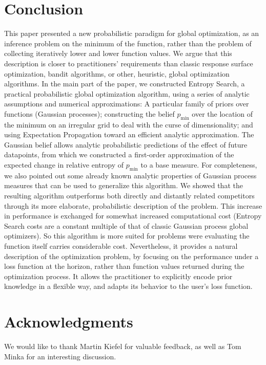 \documentclass[twoside,11pt]{article}
\newcommand{\pmin}{p_{\min}}
\begin{document}
\section{Conclusion}
\label{sec:conclusion}

This paper presented a new probabilistic paradigm for global
optimization, as an inference problem on the minimum of the function,
rather than the problem of collecting iteratively lower and lower
function values. We argue that this description is closer to
practitioners' requirements than classic response surface
optimization, bandit algorithms, or other, heuristic, global
optimization algorithms. In the main part of the paper, we constructed
Entropy Search, a practical probabilistic global optimization
algorithm, using a series of analytic assumptions and numerical
approximations: A particular family of priors over functions (Gaussian
processes); constructing the belief $\pmin$ over the location of the
minimum on an irregular grid to deal with the curse of dimensionality;
and using Expectation Propagation toward an efficient analytic
approximation. The Gaussian belief allows analytic probabilistic
predictions of the effect of future datapoints, from which we
constructed a first-order approximation of the expected change in
relative entropy of $\pmin$ to a base measure. For completeness, we
also pointed out some already known analytic properties of Gaussian
process measures that can be used to generalize this algorithm. We
showed that the resulting algorithm outperforms both directly and
distantly related competitors through its more elaborate,
probabilistic description of the problem. This increase in performance
is exchanged for somewhat increased computational cost (Entropy Search
costs are a constant multiple of that of classic Gaussian process
global optimizers). So this algorithm is more suited for problems were
evaluating the function itself carries considerable
cost. Nevertheless, it provides a natural description of the
optimization problem, by focusing on the performance under a loss
function at the horizon, rather than function values returned during
the optimization process. It allows the practitioner to explicitly
encode prior knowledge in a flexible way, and adapts its behavior to
the user's loss function.

\section*{Acknowledgments}
\label{sec:acknowledgments}

We would like to thank Martin Kiefel for valuable feedback, as well as
Tom Minka for an interesting discussion.
\end{document}
